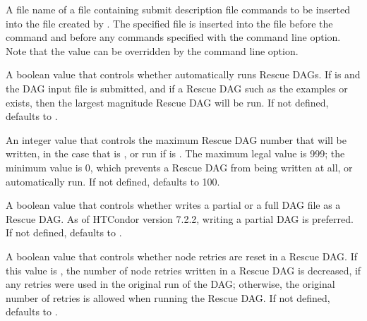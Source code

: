 \begin{description}
\label{param:DAGManInsertSubFile}
\item[\Macro{DAGMAN\_INSERT\_SUB\_FILE}]
  A file name of a file containing submit description file commands to be
  inserted into the  file created by .
  The specified file is inserted into the  file before
  the  command and before any commands specified with the
    command line option.
  Note that the  value can be overridden
  by the   command line option.

\label{param:DAGManAutoRescue}
\item[\Macro{DAGMAN\_AUTO\_RESCUE}]
  A boolean value that controls whether  automatically
  runs Rescue DAGs.  If  is 
  and the DAG input file  is submitted,
  and if a Rescue DAG such as the examples  or
   exists, 
  then the largest magnitude Rescue DAG will be run.
  If not defined,  defaults to .

\label{param:DAGManMaxRescueNum}
\item[\Macro{DAGMAN\_MAX\_RESCUE\_NUM}]
  An integer value that controls the maximum Rescue DAG
  number that will be written, 
  in the case that  is ,
  or run if  is .
  The maximum legal value is 999; the minimum value is 0,
  which prevents a Rescue DAG from being written at all,
  or automatically run.
  If not defined,  defaults to 100.

\label{param:DAGManWritePartialRescue}
\item[\Macro{DAGMAN\_WRITE\_PARTIAL\_RESCUE}]
  A boolean value that controls whether  writes a partial
  or a full DAG file as a Rescue DAG.  
  As of HTCondor version 7.2.2, writing a partial DAG is preferred.
  If not defined,  defaults to
  .

\label{param:DAGManResetRetriesUponRescue}
\item[\Macro{DAGMAN\_RESET\_RETRIES\_UPON\_RESCUE}]
  A boolean value that controls whether node retries are reset in a Rescue
  DAG.  If this value is , the number of node retries written
  in a Rescue DAG is decreased,
  if any retries were used in the original run of the DAG; 
  otherwise, the original number of retries is allowed
  when running the Rescue DAG.
  If not defined,  defaults to
  .


\end{description}
